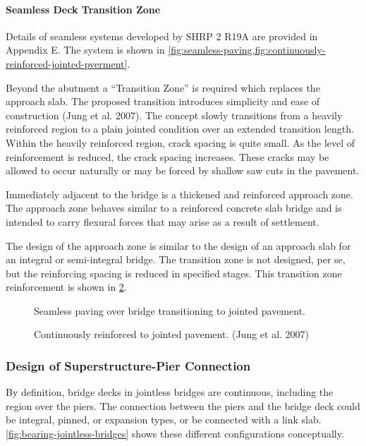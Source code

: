 \paragraph{Seamless Deck Transition Zone}
Details of seamless systems developed by SHRP 2 R19A are provided in Appendix E. The system is shown in \cref{fig:seamless-paving,fig:continuously-reinforced-jointed-pverment}.

Beyond the abutment a “Transition Zone” is required which replaces the approach slab. The proposed transition
introduces simplicity and ease of construction (Jung et al. 2007). The concept slowly transitions from a heavily
reinforced region to a plain jointed condition over an extended transition length. Within the heavily reinforced region,
crack spacing is quite small. As the level of reinforcement is reduced, the crack spacing increases. These cracks may
be allowed to occur naturally or may be forced by shallow saw cuts in the pavement.

Immediately adjacent to the bridge is a thickened and reinforced approach zone. The approach zone behaves
similar to a reinforced concrete slab bridge and is intended to carry flexural forces that may arise as a result of
settlement.

The design of the approach zone is similar to the design of an approach slab for an integral or semi-integral
bridge. The transition zone is not designed, per se, but the reinforcing spacing is reduced in specified stages. This
transition zone reinforcement is shown in \cref{fig:continuously-reinforced-jointed-pverment}.

\begin{figure}
  \caption{Seamless paving over bridge transitioning to jointed pavement.}
  \label{fig:seamless-paving}
\end{figure}

\begin{figure}
  \caption{Continuously reinforced to jointed pavement. (Jung et al. 2007)}
  \label{fig:continuously-reinforced-jointed-pverment}
\end{figure}

\subsubsection{Design of Superstructure-Pier Connection}
By definition, bridge decks in jointless bridges are continuous, including the region over the piers. The connection between the piers and the bridge deck could be integral, pinned, or expansion types, or be connected with a link slab. \cref{fig:bearing-jointless-bridges} shows these different configurations conceptually.

